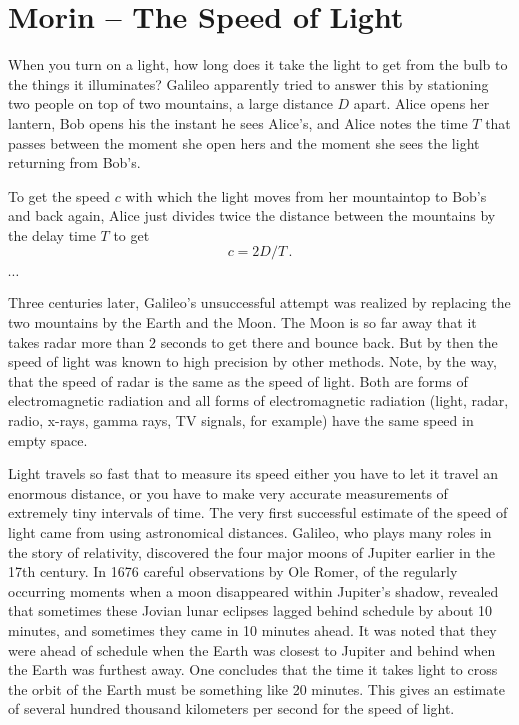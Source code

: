 \chapter{Morin -- The Speed of Light}
\label{ch:Morin_03}

When you turn on a light, how long does it take the light to get from the bulb to the things it illuminates?
Galileo apparently tried to answer this by stationing two people on top of two mountains, a large distance $D$ apart. Alice opens her lantern, Bob opens his the instant he sees Alice's, and Alice notes the time $T$ that passes between the moment she open hers and the moment she sees the light returning from Bob's.

To get the speed $c$ with which the light moves from her mountaintop to Bob's and back again, Alice just divides twice the distance between the mountains by the delay time $T$ to get
\begin{equation}\label{eq:Morin_03.1}
c = 2 D / T\,. 
\end{equation}

$\cdots$

Three centuries later, Galileo's unsuccessful attempt was realized by replacing the two mountains by the Earth and the Moon. The Moon is so far away that it takes radar more than $2$ seconds to get there and bounce back. But by then the speed of light was known to high precision by other methods. Note, by the way, that the speed of radar is the same as the speed of light. Both are forms of electromagnetic radiation and all forms of electromagnetic radiation (light, radar, radio, x-rays, gamma rays, TV signals, for example) have the same speed in empty space. 

Light travels so fast that to measure its speed either you have to let it travel an enormous distance, or you have to make very accurate measurements of extremely tiny intervals of time. The very first successful estimate of the speed of light came from using astronomical distances. Galileo, who plays many roles in the story of relativity, discovered the four major moons of Jupiter earlier in the 17th century. In 1676 careful observations by Ole Romer, of the regularly occurring moments when a moon disappeared within Jupiter's shadow, revealed that sometimes these Jovian lunar eclipses lagged behind schedule by about 10 minutes, and sometimes they came in 10 minutes ahead. It was noted that they were ahead of schedule when the Earth was closest to Jupiter and behind when the Earth was furthest away. One concludes that the time it takes light to cross the orbit of the Earth must be something like 20 minutes. This gives an estimate of several hundred thousand kilometers per second for the speed of light. 

